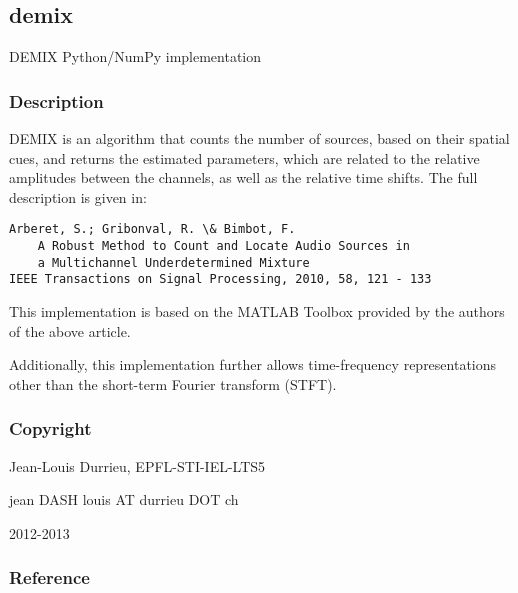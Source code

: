 \documentclass[letterpaper,10pt,english]{sphinxmanual}
\begin{document}
\subsection{demix}
\label{reference/demix:module-pyfasst.demixTF}\label{reference/demix::doc}\label{reference/demix:demix}
DEMIX Python/NumPy implementation


\subsubsection{Description}
\label{reference/demix:description}
DEMIX is an algorithm that counts the number of sources,
based on their spatial cues, and returns the estimated parameters,
which are related to the relative amplitudes between the channels,
as well as the relative time shifts. The full description is given
in:

\begin{Verbatim}[commandchars=\\\{\}]
Arberet, S.; Gribonval, R. \& Bimbot, F.
    A Robust Method to Count and Locate Audio Sources in
    a Multichannel Underdetermined Mixture
IEEE Transactions on Signal Processing, 2010, 58, 121 - 133
\end{Verbatim}

This implementation is based on the MATLAB Toolbox provided
by the authors of the above article.

Additionally, this implementation further allows time-frequency
representations other than the short-term Fourier transform (STFT).


\subsubsection{Copyright}
\label{reference/demix:copyright}
Jean-Louis Durrieu, EPFL-STI-IEL-LTS5

jean DASH louis AT durrieu DOT ch

2012-2013


\subsubsection{Reference}
\label{reference/demix:reference}
\end{document}
